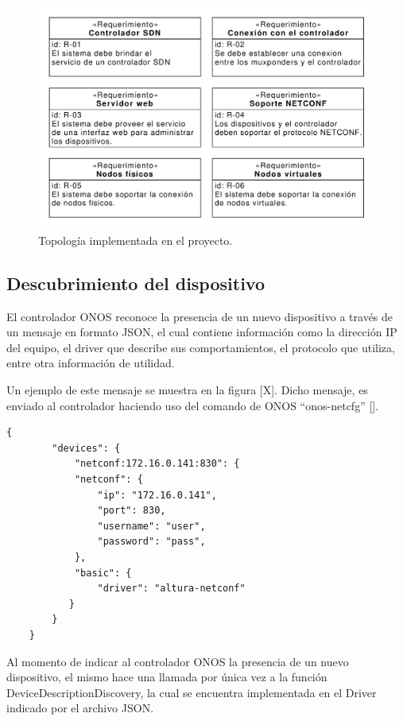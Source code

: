  \begin{figure}[H]
    \centering
    \includegraphics[scale=0.65]{Figures/req_sys.pdf}
    \caption{Topología implementada en el proyecto.}
    \label{fig:req_sys}
  \end{figure}

  \subsection{Descubrimiento del dispositivo}
  El controlador ONOS reconoce la presencia de un nuevo dispositivo a través de un mensaje en formato JSON, el cual contiene información como la dirección IP del equipo, el driver que describe sus comportamientos, el protocolo que utiliza, entre otra información de utilidad. 
  
  Un ejemplo de este mensaje se muestra en la figura [X]. Dicho mensaje, es enviado al controlador haciendo uso del comando de ONOS “onos-netcfg” [].

  \begin{lstlisting}[language=SHELXL, caption=Interacción tipica con un dispositivo mediante \textit{CLI}., label=lstlisting:cli]
    {
        "devices": {
            "netconf:172.16.0.141:830": {
            "netconf": {
                "ip": "172.16.0.141",
                "port": 830,
                "username": "user",
                "password": "pass",
            },
            "basic": {
                "driver": "altura-netconf"
           }
        }
    }
    \end{lstlisting}


    Al momento de indicar al controlador ONOS la presencia de un nuevo dispositivo, el mismo hace una llamada por única vez a la función DeviceDescriptionDiscovery, la cual se encuentra implementada en el Driver indicado por el archivo JSON. 

